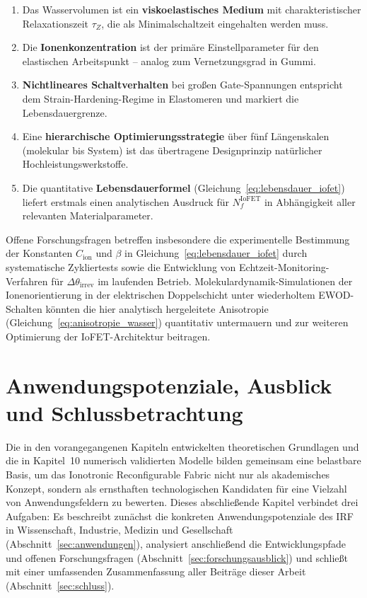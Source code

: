 ﻿\documentclass[a4paper,12pt]{scrreprt}
\theoremstyle{definition}
\begin{document}
\begin{enumerate}
	\item Das Wasservolumen ist ein \textbf{viskoelastisches Medium} mit
	charakteristischer Relaxationszeit $\tau_Z$, die als Minimalschaltzeit
	eingehalten werden muss.
	\item Die \textbf{Ionenkonzentration} ist der primäre Einstellparameter
	für den elastischen Arbeitspunkt -- analog zum Vernetzungsgrad in Gummi.
	\item \textbf{Nichtlineares Schaltverhalten} bei großen Gate-Spannungen
	entspricht dem Strain-Hardening-Regime in Elastomeren und markiert die
	Lebensdauergrenze.
	\item Eine \textbf{hierarchische Optimierungsstrategie} über fünf
	Längenskalen (molekular bis System) ist das übertragene Designprinzip
	natürlicher Hochleistungswerkstoffe.
	\item Die quantitative \textbf{Lebensdauerformel}
	(Gleichung~\eqref{eq:lebensdauer_iofet}) liefert erstmals einen
	analytischen Ausdruck für $N_f^{\mathrm{IoFET}}$ in Abhängigkeit
	aller relevanten Materialparameter.
\end{enumerate}

Offene Forschungsfragen betreffen insbesondere die experimentelle Bestimmung
der Konstanten $C_{\mathrm{ion}}$ und $\beta$ in
Gleichung~\eqref{eq:lebensdauer_iofet} durch systematische Zykliertests
sowie die Entwicklung von Echtzeit-Monitoring-Verfahren für
$\Delta\theta_{\mathrm{irrev}}$ im laufenden Betrieb. Molekulardynamik-Simulationen
der Ionenorientierung in der elektrischen Doppelschicht unter
wiederholtem EWOD-Schalten könnten die hier analytisch hergeleitete
Anisotropie (Gleichung~\eqref{eq:anisotropie_wasser}) quantitativ
untermauern und zur weiteren Optimierung der IoFET-Architektur beitragen.

\section{Anwendungspotenziale, Ausblick und Schlussbetrachtung}
\label{sec:ausblick_und_schluss}

Die in den vorangegangenen Kapiteln entwickelten theoretischen Grundlagen
und die in Kapitel~10 numerisch validierten Modelle bilden gemeinsam eine
belastbare Basis, um das Ionotronic Reconfigurable Fabric nicht nur als
akademisches Konzept, sondern als ernsthaften technologischen Kandidaten
für eine Vielzahl von Anwendungsfeldern zu bewerten. Dieses abschließende
Kapitel verbindet drei Aufgaben: Es beschreibt zunächst die konkreten
Anwendungspotenziale des IRF in Wissenschaft, Industrie, Medizin und
Gesellschaft (Abschnitt~\ref{sec:anwendungen}), analysiert anschließend
die Entwicklungspfade und offenen Forschungsfragen (Abschnitt~\ref{sec:forschungsausblick})
und schließt mit einer umfassenden Zusammenfassung aller Beiträge dieser
Arbeit (Abschnitt~\ref{sec:schluss}).
\end{document}
